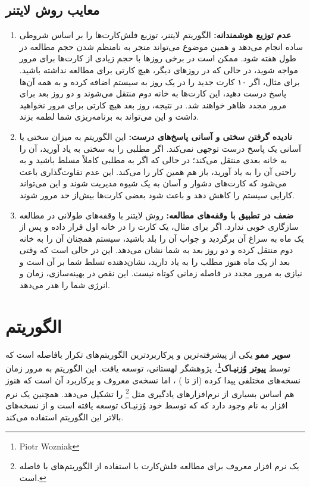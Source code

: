 \documentclass[12pt]{report}
\begin{document}
\section{معایب روش لایتنر}
\begin{enumerate}
    \item \textbf{عدم توزیع هوشمندانه:} الگوریتم لایتنر، توزیع فلش‌کارت‌ها را بر اساس شروطی ساده انجام می‌دهد و همین موضوع می‌تواند منجر به نامنظم شدن حجم مطالعه در طول هفته شود. ممکن است در برخی روزها با حجم زیادی از کارت‌ها برای مرور مواجه شوید، در حالی که در روزهای دیگر، هیچ کارتی برای مطالعه نداشته باشید. برای مثال، اگر ۱۰ کارت جدید را در یک روز به سیستم اضافه کرده و به همه آن‌ها پاسخ درست دهید، این کارت‌ها به خانه دوم منتقل می‌شوند و دو روز بعد برای مرور مجدد ظاهر خواهند شد. در نتیجه، روز بعد هیچ کارتی برای مرور نخواهید داشت و این می‌تواند به برنامه‌ریزی شما لطمه بزند.
    \item \textbf{نادیده گرفتن سختی و آسانی پاسخ‌های درست:} این الگوریتم به میزان سختی یا آسانی یک پاسخ درست توجهی نمی‌کند. اگر مطلبی را به سختی به یاد آورید، آن را به خانه بعدی منتقل می‌کند؛ در حالی که اگر به مطلبی کاملاً مسلط باشید و به راحتی آن را به یاد آورید، باز هم همین کار را می‌کند. این عدم تفاوت‌گذاری باعث می‌شود که کارت‌های دشوار و آسان به یک شیوه مدیریت شوند و این می‌تواند کارایی سیستم را کاهش دهد و باعث شود بعضی کارت‌ها بیش‌از حد مرور شوند.
    \item \textbf{ضعف در تطبیق با وقفه‌های مطالعه:} روش لایتنر با وقفه‌های طولانی در مطالعه سازگاری خوبی ندارد. اگر برای مثال، یک کارت را در خانه اول قرار داده و پس از یک ماه به سراغ آن برگردید و جواب آن را بلد باشید، سیستم همچنان آن را به خانه دوم منتقل کرده و دو روز بعد به شما نشان می‌دهد. این در حالی است که وقتی بعد از یک ماه هنوز مطلب را به یاد دارید، نشان‌دهنده تسلط شما بر آن است و نیازی به مرور مجدد در فاصله زمانی کوتاه نیست. این نقص در بهینه‌سازی، زمان و انرژی شما را هدر می‌دهد.
\end{enumerate}

\chapter{الگوریتم }

\textbf{سوپر ممو} 
یکی از پیشرفته‌ترین و پرکاربردترین الگوریتم‌های تکرار بافاصله است که توسط 
\textbf{پیوتر وُزنیـاک\footnote{Piotr Wozniak}}، پژوهشگر لهستانی، توسعه یافت. این الگوریتم به مرور زمان نسخه‌های مختلفی پیدا کرده (از  تا )
، اما نسخه‌ی معروف و پرکاربرد آن \textbf{} است که هنوز هم اساس بسیاری از نرم‌افزارهای یادگیری 
مثل 
\footnote{ یک نرم افزار معروف برای مطالعه فلش‌کارت با استفاده از الگوریتم‌های با فاصله است.}
را تشکیل می‌دهد.\cite{lstm}
همچنین یک نرم افزار به نام 
 وجود دارد که 
که توسط خود وُزنیـاک توسعه یافته است
و از نسخه‌های بالاتر این الگوریتم استفاده می‌کند.
\end{document}
